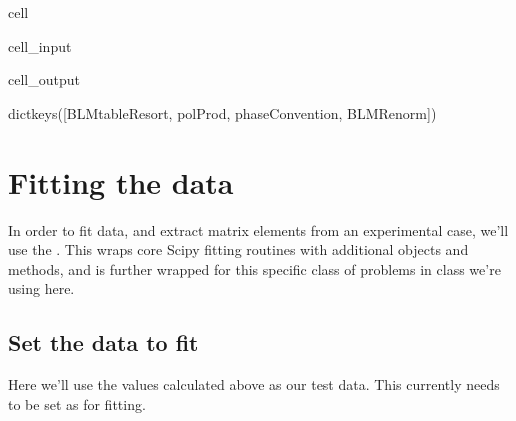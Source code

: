 \documentclass[letterpaper,table,10pt,english]{jupyterBook}
\begin{document}
\begin{sphinxuseclass}{cell}\begin{sphinxVerbatimInput}

\begin{sphinxuseclass}{cell_input}
\begin{sphinxVerbatim}[commandchars=\\\{\}]
\end{sphinxVerbatim}

\end{sphinxuseclass}\end{sphinxVerbatimInput}
\begin{sphinxVerbatimOutput}

\begin{sphinxuseclass}{cell_output}
\begin{sphinxVerbatim}[commandchars=\\\{\}]
dict\PYGZus{}keys([\PYGZsq{}BLMtableResort\PYGZsq{}, \PYGZsq{}polProd\PYGZsq{}, \PYGZsq{}phaseConvention\PYGZsq{}, \PYGZsq{}BLMRenorm\PYGZsq{}])
\end{sphinxVerbatim}

\end{sphinxuseclass}\end{sphinxVerbatimOutput}

\end{sphinxuseclass}

\section{Fitting the data}
\label{\detokenize{part2/basic_fitting_numerics_intro_260423:fitting-the-data}}
\sphinxAtStartPar
In order to fit data, and extract matrix elements from an experimental case, we’ll use the . This wraps core Scipy fitting routines with additional objects and methods, and is further wrapped for this specific class of problems in  class we’re using here.


\subsection{Set the data to fit}
\label{\detokenize{part2/basic_fitting_numerics_intro_260423:set-the-data-to-fit}}
\sphinxAtStartPar
Here we’ll use the values calculated above as our test data. This currently needs to be set as  for fitting.
\end{document}
